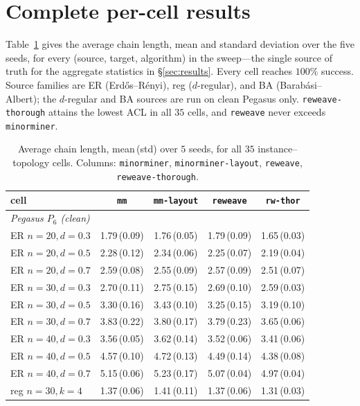 \documentclass[acmsmall,anonymous,nonacm]{acmart}
\begin{document}
\section{Complete per-cell results}
\label{app:full}

Table~\ref{tab:full} gives the average chain length, mean and standard deviation
over the five seeds, for every (source, target, algorithm) in the sweep---the
single source of truth for the aggregate statistics in \S\ref{sec:results}. Every
cell reaches $100\%$ success. Source families are ER (Erd\H{o}s--R\'enyi), reg
($d$-regular), and BA (Barab\'asi--Albert); the $d$-regular and BA sources are
run on clean Pegasus only. \texttt{reweave-thorough} attains the lowest ACL in
all $35$ cells, and \texttt{reweave} never exceeds \texttt{minorminer}.

\begin{table}[h]
\caption{Average chain length, mean\,(std) over $5$ seeds, for all $35$
instance--topology cells. Columns: \texttt{minorminer}, \texttt{minorminer-layout},
\texttt{reweave}, \texttt{reweave-thorough}.}
\label{tab:full}
\footnotesize
\setlength{\tabcolsep}{3.5pt}
\begin{tabular}{lcccc}
\toprule
cell & \texttt{mm} & \texttt{mm-layout} & \texttt{reweave} & \texttt{rw-thor} \\
\midrule
\multicolumn{5}{l}{\emph{Pegasus $P_6$ (clean)}}\\
\midrule
ER $n{=}20,d{=}0.3$ & 1.79\,(0.09) & 1.76\,(0.05) & 1.79\,(0.09) & 1.65\,(0.03) \\
ER $n{=}20,d{=}0.5$ & 2.28\,(0.12) & 2.34\,(0.06) & 2.25\,(0.07) & 2.19\,(0.04) \\
ER $n{=}20,d{=}0.7$ & 2.59\,(0.08) & 2.55\,(0.09) & 2.57\,(0.09) & 2.51\,(0.07) \\
ER $n{=}30,d{=}0.3$ & 2.70\,(0.11) & 2.75\,(0.15) & 2.69\,(0.10) & 2.59\,(0.03) \\
ER $n{=}30,d{=}0.5$ & 3.30\,(0.16) & 3.43\,(0.10) & 3.25\,(0.15) & 3.19\,(0.10) \\
ER $n{=}30,d{=}0.7$ & 3.83\,(0.22) & 3.80\,(0.17) & 3.79\,(0.23) & 3.65\,(0.06) \\
ER $n{=}40,d{=}0.3$ & 3.56\,(0.05) & 3.62\,(0.14) & 3.52\,(0.06) & 3.41\,(0.06) \\
ER $n{=}40,d{=}0.5$ & 4.57\,(0.10) & 4.72\,(0.13) & 4.49\,(0.14) & 4.38\,(0.08) \\
ER $n{=}40,d{=}0.7$ & 5.15\,(0.06) & 5.23\,(0.17) & 5.07\,(0.04) & 4.97\,(0.04) \\
reg $n{=}30,k{=}4$ & 1.37\,(0.06) & 1.41\,(0.11) & 1.37\,(0.06) & 1.31\,(0.03) \\

\end{tabular}
\end{table}
\end{document}

